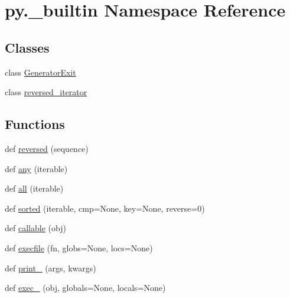 \hypertarget{namespacepy_1_1__builtin}{}\section{py.\+\_\+builtin Namespace Reference}
\label{namespacepy_1_1__builtin}
\subsection*{Classes}
\begin{DoxyCompactItemize}
\item 
class \hyperlink{classpy_1_1__builtin_1_1_generator_exit}{Generator\+Exit}
\item 
class \hyperlink{classpy_1_1__builtin_1_1reversed__iterator}{reversed\+\_\+iterator}
\end{DoxyCompactItemize}
\subsection*{Functions}
\begin{DoxyCompactItemize}
\item 
def \hyperlink{namespacepy_1_1__builtin_af8bc219fdf4a207651ea11ffcb0e33c6}{reversed} (sequence)
\item 
def \hyperlink{namespacepy_1_1__builtin_a3f594e247efb828922e4c80026813821}{any} (iterable)
\item 
def \hyperlink{namespacepy_1_1__builtin_a2070db5def6955711ebee00840d3a0cd}{all} (iterable)
\item 
def \hyperlink{namespacepy_1_1__builtin_aa08168667a2fbab4583371173cbc6e85}{sorted} (iterable, cmp=None, key=None, reverse=0)
\item 
def \hyperlink{namespacepy_1_1__builtin_a869c49c20eff71f3b700aa5495f22844}{callable} (obj)
\item 
def \hyperlink{namespacepy_1_1__builtin_af40328c21a713c0533167b79290aab16}{execfile} (fn, globs=None, locs=None)
\item 
def \hyperlink{namespacepy_1_1__builtin_aecf984c0e0aad62105cd32877fdd26c1}{print\+\_\+} (args, kwargs)
\item 
def \hyperlink{namespacepy_1_1__builtin_a6e8904469a7a9531875865374f777dcd}{exec\+\_\+} (obj, globals=None, locals=None)
\end{DoxyCompactItemize}
